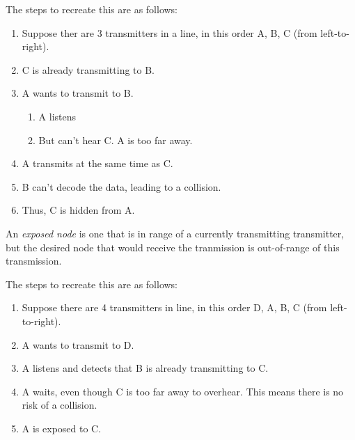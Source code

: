 The steps to recreate this are as follows:
\begin{enumerate}[noitemsep]
\item Suppose ther are 3 transmitters in a line, in this order A, B, C (from left-to-right).
\item C is already transmitting to B.
\item A wants to transmit to B.
  \begin{enumerate}[noitemsep]
  \item A listens
  \item But can't hear C. A is too far away.
  \end{enumerate}

\item A transmits at the same time as C.
\item B can't decode the data, leading to a collision.
\item Thus, C is hidden from A.
\end{enumerate}

\begin{definition}\label{def:Exposed_Node}
  An \emph{exposed node} is one that is in range of a currently transmitting transmitter, but the desired node that would receive the tranmission is out-of-range of this transmission.
\end{definition}

The steps to recreate this are as follows:
\begin{enumerate}[noitemsep]
\item Suppose there are 4 transmitters in line, in this order D, A, B, C (from left-to-right).
\item A wants to transmit to D.
\item A listens and detects that B is already transmitting to C.
\item A waits, even though C is too far away to overhear. This means there is no risk of a collision.
\item A is exposed to C.
\end{enumerate}


